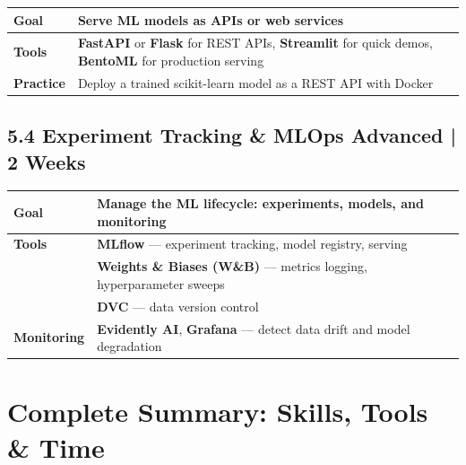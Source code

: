 \documentclass[a4paper,11pt]{article}
\begin{document}
\begin{tabular}{>{\bfseries}p{3cm} p{11.5cm}}
\toprule
Goal & Serve ML models as APIs or web services \\
\midrule
Tools & \textbf{FastAPI} or \textbf{Flask} for REST APIs, \textbf{Streamlit} for quick demos, \textbf{BentoML} for production serving \\
Practice & Deploy a trained scikit-learn model as a REST API with Docker \\
\bottomrule
\end{tabular}

\subsection{5.4 Experiment Tracking \& MLOps \hfill \small\normalfont\color{darkgray}Advanced | 2 Weeks}

\begin{tabular}{>{\bfseries}p{3cm} p{11.5cm}}
\toprule
Goal & Manage the ML lifecycle: experiments, models, and monitoring \\
\midrule
Tools & \textbf{MLflow} — experiment tracking, model registry, serving \\
 & \textbf{Weights \& Biases (W\&B)} — metrics logging, hyperparameter sweeps \\
 & \textbf{DVC} — data version control \\
Monitoring & \textbf{Evidently AI}, \textbf{Grafana} — detect data drift and model degradation \\
\bottomrule
\end{tabular}

\newpage
\section{Complete Summary: Skills, Tools \& Time}
\end{document}
